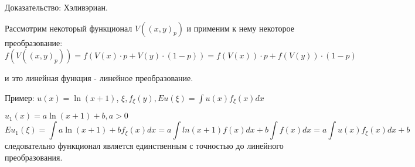 \documentclass[aps,%
12pt,%
final,%
oneside,
onecolumn,%
musixtex, %
superscriptaddress,%
centertags]{article} %
\theoremstyle{plain}
\theoremstyle{definition}
\theoremstyle{remark}
\begin{document}
Доказательство: Хэливэриан.

Рассмотрим некоторый функционал $V((x,y)_p)$ и применим к нему некоторое преобразование:
$$f\left(V((x,y)_p)\right) = f(V(x)\cdot p+V(y)\cdot (1-p)) = f(V(x))\cdot p + f(V(y))\cdot (1-p)$$

и это линейная функция - линейное преобразование.

Пример: $u(x) = \ln (x+1)$, $\xi, f_{\xi}(y), Eu(\xi) = \int\limits u(x)f_{\xi}(x)dx$

$u_1(x) = a\ln(x+1) + b, a>0$
$$Eu_1(\xi) =  \int\limits  a\ln(x+1) + bf_{\xi}(x)dx = a\int ln(x+1)f(x)dx+b\int\limits f(x)dx = a\int\limits u(x)f_{\xi}(x)dx + b$$
следовательно функционал является единственным с точностью до линейного преобразования.
\end{document}
